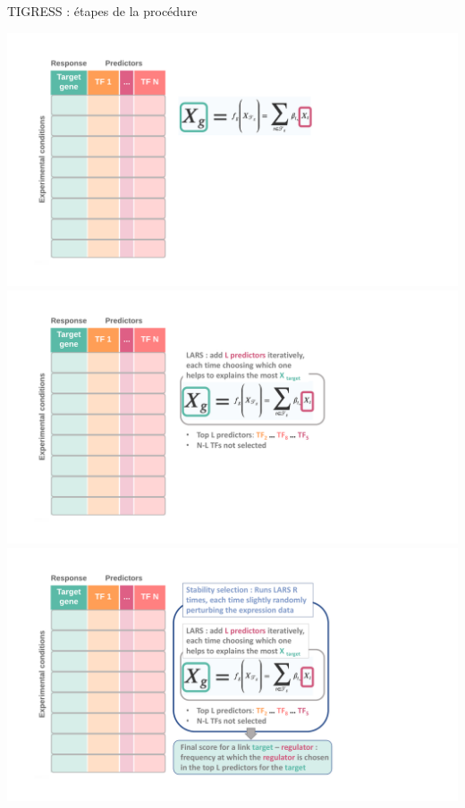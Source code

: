 \begin{frame}{TIGRESS : étapes de la procédure}
	\vspace{-0.3cm}
	\begin{overprint}
	  \includegraphics[scale=0.35]{Figures/Regression/tigress_1-1.pdf}
	 \onslide<2> \includegraphics[scale=0.35]{Figures/Regression/tigress_2-2.pdf}
	 \onslide<3> \includegraphics[scale=0.35]{Figures/Regression/tigress_3-3.pdf}

\end{overprint}
\end{frame}

